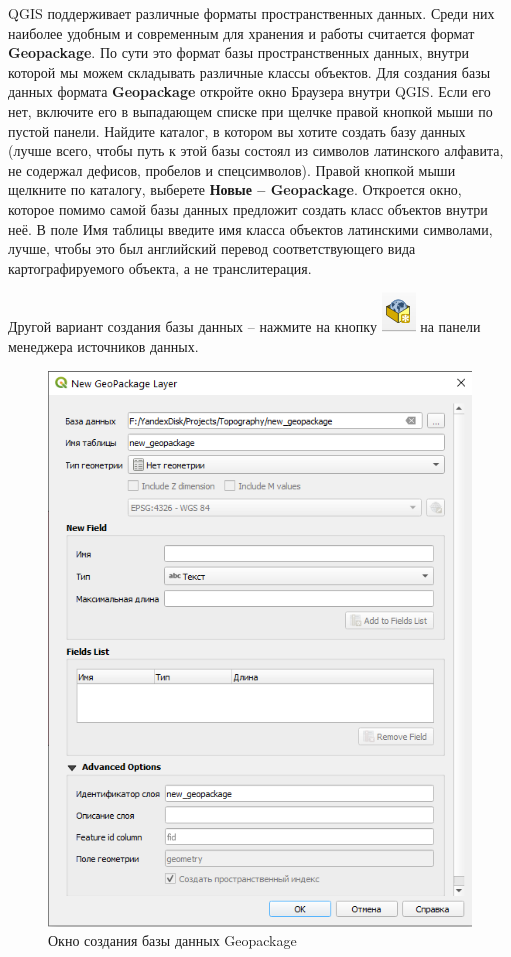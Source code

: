 \documentclass[
  12pt,
]{book}
\begin{document}
QGIS поддерживает различные форматы пространственных данных. Среди них наиболее удобным и современным для хранения и работы считается формат \textbf{Geopackage}. По сути это формат базы пространственных данных, внутри которой мы можем складывать различные классы объектов. Для создания базы данных формата \textbf{Geopackage} откройте окно Браузера внутри QGIS. Если его нет, включите его в выпадающем списке при щелчке правой кнопкой мыши по пустой панели. Найдите каталог, в котором вы хотите создать базу данных (лучше всего, чтобы путь к этой базы состоял из символов латинского алфавита, не содержал дефисов, пробелов и спецсимволов). Правой кнопкой мыши щелкните по каталогу, выберете \textbf{Новые -- Geopackage}. Откроется окно, которое помимо самой базы данных предложит создать класс объектов внутри неё. В поле Имя таблицы введите имя класса объектов латинскими символами, лучше, чтобы это был английский перевод соответствующего вида картографируемого объекта, а не транслитерация.

Другой вариант создания базы данных -- нажмите на кнопку \includegraphics{images/vector/New_gpkg_layer.png} на панели менеджера источников данных.

\begin{figure}
\centering
\includegraphics{images/vector/Create_gpkg.png}
\caption{Окно создания базы данных Geopackage}
\end{figure}
\end{document}
